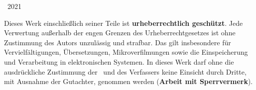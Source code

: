 \begin{titlepage}
\begin{center}
		\textcopyright\ 2021\\[1.5ex]
	\end{center}

	\singlespacing
	\small
	\noindent Dieses Werk einschließlich seiner Teile ist \textbf{urheberrechtlich geschützt}. Jede Verwertung außerhalb der engen Grenzen des Urheberrechtgesetzes ist ohne Zustimmung des Autors unzulässig und strafbar. Das gilt insbesondere für Vervielfältigungen, Übersetzungen, Mikroverfilmungen sowie die Einspeicherung und Verarbeitung in elektronischen Systemen. In dieses Werk darf ohne die ausdrückliche Zustimmung der \ewe\ und des Verfassers keine Einsicht durch Dritte, mit Ausnahme der Gutachter, genommen werden (\textbf{Arbeit mit Sperrvermerk}).
	
\end{titlepage}

